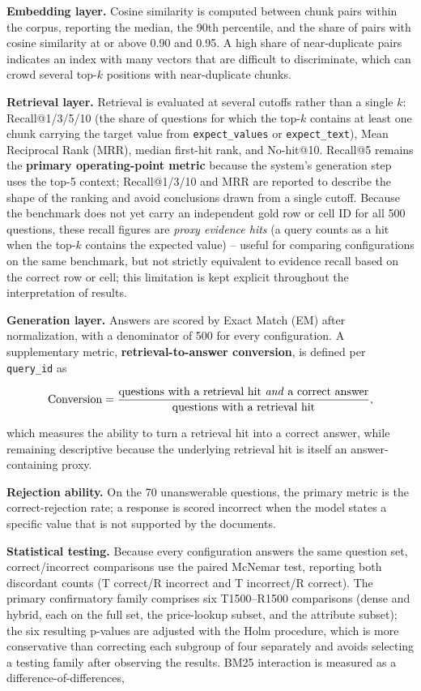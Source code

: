 \documentclass[11pt,a4paper]{article}
\begin{document}
\textbf{Embedding layer.} Cosine similarity is computed between chunk pairs
within the corpus, reporting the median, the 90th percentile, and the share
of pairs with cosine similarity at or above 0.90 and 0.95. A high share of
near-duplicate pairs indicates an index with many vectors that are difficult
to discriminate, which can crowd several top-$k$ positions with near-duplicate
chunks.

\textbf{Retrieval layer.} Retrieval is evaluated at several cutoffs rather
than a single $k$: Recall@1/3/5/10 (the share of questions for which the
top-$k$ contains at least one chunk carrying the target value from
\texttt{expect\_values} or \texttt{expect\_text}), Mean Reciprocal Rank
(MRR), median first-hit rank, and No-hit@10. Recall@5 remains the
\textbf{primary operating-point metric} because the system's generation
step uses the top-5 context; Recall@1/3/10 and MRR are reported to describe
the shape of the ranking and avoid conclusions drawn from a single cutoff.
Because the benchmark does not yet carry an independent gold row or cell ID
for all 500 questions, these recall figures are \emph{proxy evidence hits}
(a query counts as a hit when the top-$k$ contains the expected value) --
useful for comparing configurations on the same benchmark, but not strictly
equivalent to evidence recall based on the correct row or cell; this
limitation is kept explicit throughout the interpretation of results.

\textbf{Generation layer.} Answers are scored by Exact Match (EM) after
normalization, with a denominator of 500 for every configuration. A
supplementary metric, \textbf{retrieval-to-answer conversion}, is defined
per \texttt{query\_id} as

\[
\text{Conversion}=
\frac{\text{questions with a retrieval hit \emph{and} a correct answer}}
{\text{questions with a retrieval hit}},
\]

which measures the ability to turn a retrieval hit into a correct answer,
while remaining descriptive because the underlying retrieval hit is itself
an answer-containing proxy.

\textbf{Rejection ability.} On the 70 unanswerable questions, the primary
metric is the correct-rejection rate; a response is scored incorrect when
the model states a specific value that is not supported by the documents.

\textbf{Statistical testing.} Because every configuration answers the same
question set, correct/incorrect comparisons use the paired McNemar test,
reporting both discordant counts (T correct/R incorrect and T
incorrect/R correct). The primary confirmatory family comprises six
T1500--R1500 comparisons (dense and hybrid, each on the full set, the
price-lookup subset, and the attribute subset); the six resulting p-values
are adjusted with the Holm procedure, which is more conservative than
correcting each subgroup of four separately and avoids selecting a testing
family after observing the results. BM25 interaction is measured as a
difference-of-differences,
\end{document}
